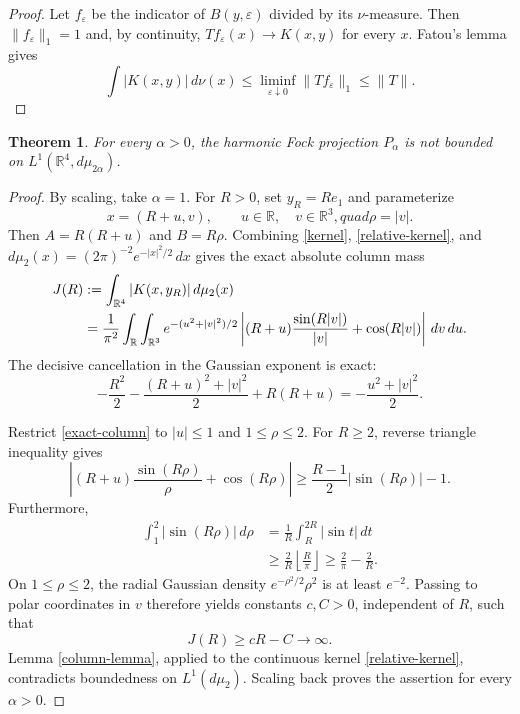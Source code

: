 \documentclass[11pt]{article}
\newtheorem{theorem}{Theorem}
\newcommand{\R}{\mathbb R}
\newcommand{\dd}{\,d}
\begin{document}
\begin{proof}
Let $f_\varepsilon$ be the indicator of $B(y,\varepsilon)$ divided by its
$\nu$-measure.  Then $\|f_\varepsilon\|_1=1$ and, by continuity,
$Tf_\varepsilon(x)\to K(x,y)$ for every $x$.  Fatou's lemma gives
\[
 \int|K(x,y)|\dd\nu(x)
 \le\liminf_{\varepsilon\downarrow0}\|Tf_\varepsilon\|_1
 \le\|T\|.
\]
\end{proof}

\begin{theorem}\label{main}
For every $\alpha>0$, the harmonic Fock projection $P_\alpha$ is not
bounded on $L^1(\R^4,d\mu_{2\alpha})$.
\end{theorem}

\begin{proof}
By scaling, take $\alpha=1$.  For $R>0$, set $y_R=Re_1$ and parameterize
\[
 x=(R+u,v),\qquad u\in\R,\quad v\in\R^3,quad \rho=|v|.
\]
Then $A=R(R+u)$ and $B=R\rho$.  Combining
\eqref{kernel}, \eqref{relative-kernel}, and
$d\mu_2(x)=(2\pi)^{-2}e^{-|x|^2/2}\dd x$ gives the exact absolute column
mass
\begin{align}
 J(R)&:=\int_{\R^4}|K(x,y_R)|\dd\mu_2(x)\notag\\
 &=\frac1{\pi^2}\int_{\R}\int_{\R^3}
 e^{-(u^2+|v|^2)/2}
 \left|(R+u)\frac{\sin(R|v|)}{|v|}+\cos(R|v|)\right|
 \dd v\dd u.\label{exact-column}
\end{align}
The decisive cancellation in the Gaussian exponent is exact:
\[
 -\frac{R^2}{2}-\frac{(R+u)^2+|v|^2}{2}+R(R+u)
 =-\frac{u^2+|v|^2}{2}.
\]

Restrict \eqref{exact-column} to $|u|\le1$ and $1\le\rho\le2$.
For $R\ge2$, reverse triangle inequality gives
\[
 \left|(R+u)\frac{\sin(R\rho)}{\rho}+\cos(R\rho)\right|
 \ge \frac{R-1}{2}|\sin(R\rho)|-1.
\]
Furthermore,
\begin{align*}
 \int_1^2|\sin(R\rho)|\dd\rho
 &=\frac1R\int_R^{2R}|\sin t|\dd t\\
 &\ge \frac{2}{R}\left\lfloor\frac R\pi\right\rfloor
 \ge \frac2\pi-\frac2R.
\end{align*}
On $1\le\rho\le2$, the radial Gaussian density
$e^{-\rho^2/2}\rho^2$ is at least $e^{-2}$.  Passing to polar coordinates
in $v$ therefore yields constants $c,C>0$, independent of $R$, such that
\[
 J(R)\ge cR-C\longrightarrow\infty.
\]
Lemma \ref{column-lemma}, applied to the continuous kernel
\eqref{relative-kernel}, contradicts boundedness on $L^1(d\mu_2)$.
Scaling back proves the assertion for every $\alpha>0$.
\end{proof}
\end{document}
